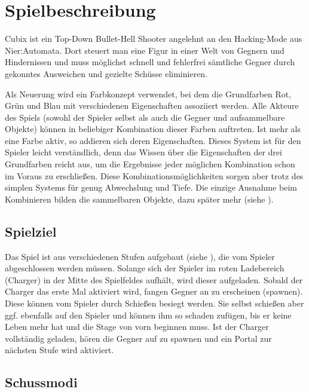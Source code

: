
\chapter{Spielbeschreibung}

Cubix ist ein Top-Down Bullet-Hell Shooter angelehnt an den Hacking-Mode aus Nier:Automata\cite{qNierHM}.
Dort steuert man eine Figur in einer Welt von Gegnern und Hindernissen und muss möglichst schnell und fehlerfrei sämtliche Gegner durch gekonntes Ausweichen und gezielte Schüsse eliminieren.

Als Neuerung wird ein Farbkonzept verwendet, bei dem die Grundfarben Rot, Grün und Blau mit verschiedenen Eigenschaften assoziiert werden. Alle Akteure des Spiels (sowohl der Spieler selbst als auch die Gegner und aufsammelbare Objekte) können in beliebiger Kombination dieser Farben auftreten. Ist mehr als eine Farbe aktiv, so addieren sich deren Eigenschaften. Dieses System ist für den Spieler leicht verständlich, denn das Wissen über die Eigenschaften der drei Grundfarben reicht aus, um die Ergebnisse jeder möglichen Kombination schon im Voraus zu erschlie{\ss}en. Diese Kombinationsmöglichkeiten sorgen aber trotz des simplen Systems für genug Abwechslung und Tiefe. Die einzige Ausnahme beim Kombinieren bilden die sammelbaren Objekte, dazu später mehr (siehe ).




\section{Spielziel}

Das Spiel ist aus verschiedenen Stufen aufgebaut (siehe ), die vom Spieler abgeschlossen werden müssen.
Solange sich der Spieler im roten Ladebereich (Charger) in der Mitte des Spielfeldes aufhält, wird dieser aufgeladen.
Sobald der Charger das erste Mal aktiviert wird, fangen Gegner an zu erscheinen (spawnen). Diese können vom Spieler durch Schie{\ss}en besiegt werden. Sie selbst schie{\ss}en aber ggf. ebenfalls auf den Spieler und können ihm so schaden zufügen, bis er keine Leben mehr hat und die Stage von vorn beginnen muss.
Ist der Charger vollständig geladen, hören die Gegner auf zu spawnen und ein Portal zur nächsten Stufe wird aktiviert.




\section{Schussmodi}

